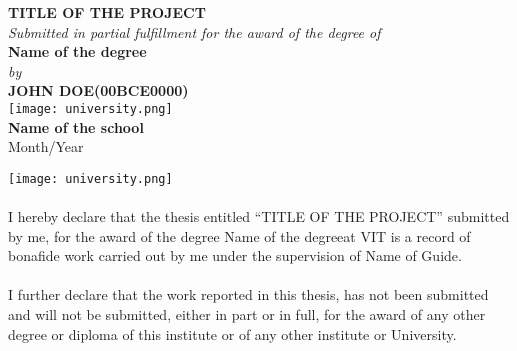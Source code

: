 \documentclass{capstone-project}
\newcommand{\projecttitle}{\uppercase{Title of the project}}
\newcommand{\degreename}{Name of the degree}
\newcommand{\guidename}{Name of Guide}
\newcommand{\authorname}{John Doe}
\newcommand{\regnum}{00BCE0000}
\begin{document}
\begin{titlepage}
    \begin{center}
        \vspace*{0.6in}
        \textbf{\LARGE{\projecttitle}}\\
        \vspace{0.6in}
        \textit{\large{Submitted in partial fulfillment for the award of the degree of}}\\
        \vspace{0.6in}
        \textbf{\Large{\degreename}}\\
        \vspace{0.9in}
        \textit{\large{by}}\\
        \vspace{0.6in}
        \uppercase{\textbf{\Large{\authorname (\regnum)}}}\\
        \vfill
        \texttt{[image: university.png]}\\
        \vspace{0.6in}
        \textbf{\large{Name of the school}}\\
        \vspace{0.3in}
        \normalsize{Month/Year}
    \end{center}
\end{titlepage}

\begin{center}
    \vspace*{0.6in}
    \texttt{[image: university.png]}\\
    \vspace{0.6in}
    \vspace{0.3in}
\end{center}
\paragraph{}
I hereby declare that the thesis entitled “\projecttitle” submitted by me, for the award of the degree \degreename at
VIT is a record of bonafide work carried out by me under the supervision of \guidename.

\paragraph{}
I further declare that the work reported in this thesis, has not been submitted and will not be submitted,
either in part or in full, for the award of any other degree or diploma of this institute or of any other institute or University.
\end{document}
